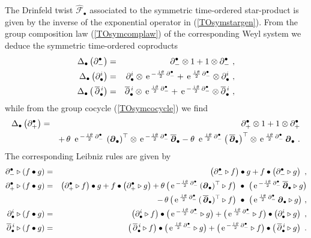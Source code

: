 \documentclass[11pt,a4paper]{article}
\newcommand{\mbf}[1]{{\boldsymbol {#1} }}
\def\ii{{\,{\rm i}\,}}
\def\mdell{{\mbf\partial}}
\def\e{{\,\rm e}\,}
\def\bea{\begin{eqnarray}}
\def\eea{\end{eqnarray}}
\newcommand{\eeq}{\end{eqnarray}}
\begin{document}
The Drinfeld twist $\hat{\mathcal F}_\bullet$ associated to the
symmetric time-ordered star-product is given by the inverse of the
exponential operator in (\ref{TOsymstargen}). From the group
composition law (\ref{TOsymcomplaw}) of the corresponding Weyl system
we deduce the symmetric time-ordered coproducts
\bea
\Delta_\bullet\left(\partial_-^\bullet\right)&=&\partial_-^\bullet
\otimes1+1\otimes\partial_-^\bullet \ , \nonumber\\
\Delta_\bullet\left(\partial^i_\bullet\right)&=&\partial^i_\bullet\otimes
\e^{-\frac{\ii\theta}2\,\partial_-^\bullet}+\e^{\frac{\ii\theta}2\,
\partial_-^\bullet}\otimes\partial^i_\bullet \ , \nonumber\\
\Delta_\bullet\left(\,\overline{\partial}{}^{\,i}_\bullet\right)&=&
\overline{\partial}{}^{\,i}_\bullet\otimes
\e^{\frac{\ii\theta}2\,\partial_-^\bullet}+\e^{-\frac{\ii\theta}2\,
\partial_-^\bullet}\otimes\overline{\partial}{}^{\,i}_\bullet \ ,
\label{STOcoprods}\eeq
while from the group cocycle (\ref{TOsymcocycle}) we find
\bea
\Delta_\bullet\left(\partial_+^\bullet\right)&=&\partial_+^\bullet\otimes1+
1\otimes\partial_+^\bullet\nonumber\\ &&
+\,\theta~\e^{-\frac{\ii\theta}2\,
\partial_-^\bullet}\,\left(\mdell_\bullet\right)^\top\otimes
\e^{-\frac{\ii\theta}2\,\partial_-^\bullet}\,\overline{\mdell}_\bullet-
\theta~\e^{\frac{\ii\theta}2\,\partial_-^\bullet}\left(\,
\overline{\mdell}_\bullet\right)^\top\otimes\e^{\frac{\ii\theta}2\,
\partial_-^\bullet}\,\mdell_\bullet \ .
\label{STOcoprodtime}\eea
The corresponding Leibniz rules are given by
\bea
\partial_-^\bullet\triangleright(f\bullet g)&=&
\left(\partial_-^\bullet\triangleright f\right)\bullet g+
f\bullet\left(\partial_-^\bullet\triangleright g\right) \ ,
\nonumber\\ \partial_+^\bullet\triangleright(f\bullet g)&=&
\left(\partial_+^\bullet\triangleright f\right)\bullet g+
f\bullet\left(\partial_+^\bullet\triangleright g\right)
+\theta\,\bigl(\e^{-\frac{\ii\theta}2\,\partial_-^\bullet}\,
(\mdell_\bullet)^\top\triangleright f\bigr)~\bullet~\bigl(
\e^{-\frac{\ii\theta}2\,\partial_-^\bullet}\,
\overline{\mdell}_\bullet\triangleright g\bigr) \nonumber\\ &&
\qquad\qquad\qquad\qquad\qquad\qquad -\,
\theta\,\bigl(\e^{\frac{\ii\theta}2\,\partial_-^\bullet}\,
(\,\overline{\mdell}_\bullet)^\top\triangleright f\bigr)~\bullet~
\bigl(\e^{\frac{\ii\theta}2\,\partial_-^\bullet}\,\mdell_\bullet
\triangleright g\bigr) \ , \nonumber\\
\partial^i_\bullet\triangleright(f\bullet g)&=&\left(\partial^i_\bullet
\triangleright f\right)\bullet\bigl(\e^{-\frac{\ii\theta}2\,
\partial_-^\bullet}\triangleright g\bigr)+\bigl(
\e^{\frac{\ii\theta}2\,\partial_-^\bullet}\triangleright f
\bigr)\bullet\left(\partial^i_\bullet\triangleright g\right) \ ,
\nonumber\\ \overline{\partial}{}^{\,i}_\bullet\triangleright(f\bullet g)
&=&\left(\,\overline{\partial}{}^{\,i}_\bullet
\triangleright f\right)\bullet\bigl(\e^{\frac{\ii\theta}2\,
\partial_-^\bullet}\triangleright g\bigr)+\bigl(
\e^{-\frac{\ii\theta}2\,\partial_-^\bullet}\triangleright f
\bigr)\bullet\left(\,\overline{\partial}{}^{\,i}_\bullet\triangleright g\right)
\ .
\label{STOLeibniz}\eea
\end{document}
